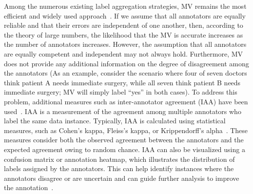 Among the numerous existing label aggregation strategies, MV remains the most efficient and widely used approach~\cite{tao_Label_2020}. If we assume that all annotators are equally reliable and that their errors are independent of one another, then, according to the theory of large numbers, the likelihood that the MV is accurate increases as the number of annotators increases. However, the assumption that all annotators are equally competent and independent may not always hold. Furthermore, MV does not provide any additional information on the degree of disagreement among the annotators (As an example, consider the scenario where four of seven doctors think patient A needs immediate surgery, while all seven think patient B needs immediate surgery; MV will simply label ``yes'' in both cases).
To address this problem, additional measures such as inter-annotator agreement (IAA) have been used~\cite{artstein_InterAnnotator_2017}. IAA is a measurement of the agreement among multiple annotators who label the same data instance. Typically, IAA is calculated using statistical measures, such as Cohen's kappa, Fleiss's kappa, or Krippendorff's alpha~\cite{krippendorff_Content_2018}. These measures consider both the observed agreement between the annotators and the expected agreement owing to random chance. IAA can also be visualized using a confusion matrix or annotation heatmap, which illustrates the distribution of labels assigned by the annotators. This can help identify instances where the annotators disagree or are uncertain and can guide further analysis to improve the annotation~\cite{carletta_Assessing_1996}.
